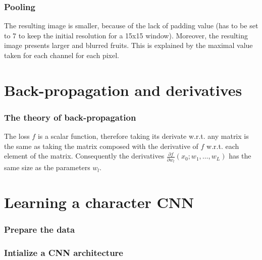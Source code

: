 \documentclass{article}
\begin{document}
\section{Pooling}

The resulting image is smaller, because of the lack of padding value (has to be set to 7 to keep the initial resolution for a 15x15 window). Moreover, the resulting image presents larger and blurred fruits. This is explained by the maximal value taken for each channel for each pixel.


\part{Back-propagation and derivatives}

\section{The theory of back-propagation}


The loss \(f\) is a scalar function, therefore taking its derivate w.r.t. any matrix is the same as taking the matrix composed with the derivative of \(f\) w.r.t. each element of the matrix. Consequently the derivatives \(\frac{\partial f}{\partial w_l}(x_0;w_1,…,w_L)\) has the same size as the parameters \(w_l\).

\part{Learning a character CNN}

\section{Prepare the data}

\section{Intialize a CNN architecture}

\end{document}
